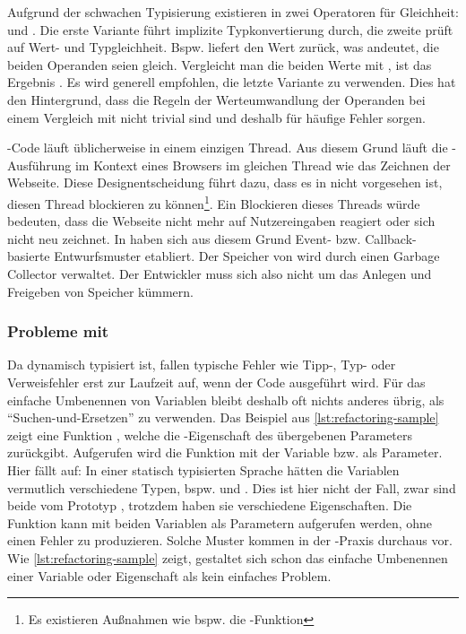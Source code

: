 \documentclass[a4paper]{scrartcl}
\begin{document}
Aufgrund der schwachen Typisierung existieren in \js{} zwei Operatoren für Gleichheit: \incode{==} und \incode{===}.
Die erste Variante führt implizite Typkonvertierung durch, die zweite prüft auf Wert- und Typgleichheit.
Bspw. liefert  den Wert \tstrue{} zurück, was andeutet, die beiden Operanden seien gleich.
Vergleicht man die beiden Werte mit \incode{===}, ist das Ergebnis \tsfalse{}.
Es wird generell empfohlen, die letzte Variante zu verwenden.
Dies hat den Hintergrund, dass die Regeln der Werteumwandlung der Operanden bei einem Vergleich mit \incode{==} nicht trivial sind und deshalb für häufige Fehler sorgen.

\js-Code läuft üblicherweise in einem einzigen Thread.
Aus diesem Grund läuft die \js-Ausführung im Kontext eines Browsers im gleichen Thread wie das Zeichnen der Webseite.
Diese Designentscheidung führt dazu, dass es in \js{} nicht vorgesehen ist, diesen Thread blockieren zu können\footnote{Es existieren Außnahmen wie bspw. die -Funktion}.
Ein Blockieren dieses Threads würde bedeuten, dass die Webseite nicht mehr auf Nutzereingaben reagiert oder sich nicht neu zeichnet.
In \js{} haben sich aus diesem Grund Event- bzw. Callback-basierte Entwurfsmuster etabliert.
Der Speicher von \js{} wird durch einen Garbage Collector verwaltet.
Der Entwickler muss sich also nicht um das Anlegen und Freigeben von Speicher kümmern.

\subsubsection*{Probleme mit \js{}}
Da \js{} dynamisch typisiert ist, fallen typische Fehler wie Tipp-, Typ- oder Verweisfehler erst zur Laufzeit auf, wenn der Code ausgeführt wird.
Für das einfache Umbenennen von Variablen bleibt deshalb oft nichts anderes übrig, als \enquote{Suchen-und-Ersetzen} zu verwenden.
Das Beispiel aus \autoref{lst:refactoring-sample} zeigt eine Funktion , welche die -Eigenschaft des übergebenen Parameters zurückgibt.
Aufgerufen wird die Funktion mit der Variable  bzw.  als Parameter.
Hier fällt auf:
In einer statisch typisierten Sprache hätten die Variablen vermutlich verschiedene Typen, bspw.  und .
Dies ist hier nicht der Fall, zwar sind beide vom Prototyp , trotzdem haben sie verschiedene Eigenschaften.
Die Funktion  kann mit beiden Variablen als Parametern aufgerufen werden, ohne einen Fehler zu produzieren.
Solche Muster kommen in der \js-Praxis durchaus vor.
Wie \autoref{lst:refactoring-sample} zeigt, gestaltet sich schon das einfache Umbenennen einer Variable oder Eigenschaft als kein einfaches Problem.
\end{document}
